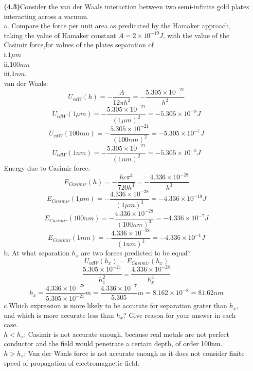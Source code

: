 \documentclass[a4paper,12pt]{report}
\begin{document}
\textbf{(4.3)}Consider the van der Waals interaction between two semi-infinite gold plates interacting across a vacuum.\\
a. Compare the force per unit area as predicated by the Hamaker approach, taking the value of Hamaker constant $A = 2\times 10^{-19} J$, with the value of the Casimir force,for values of the plates separation of\\i.$1 \mu m$\\ii.$100 nm$\\iii.$1 nm$.
\\van der Waals:
\[
U_{vdW}(h) = -\frac{A}{12\pi h^2} = -\frac{5.305\times 10^{-21}}{h^2} 
\]
\[
U_{vdW}(1 \mu m) = -\frac{5.305\times 10^{-21}}{(1 \mu m)^2} =-5.305\times 10^{-9}J
\]
\[
U_{vdW}(100 nm) = -\frac{5.305\times 10^{-21}}{(100 nm)^2} =-5.305\times 10^{-7}J
\]
\[
U_{vdW}(1 nm) = -\frac{5.305\times 10^{-21}}{(1 nm)^2} =-5.305\times 10^{-3}J
\]
Energy due to Casimir force:
\[
E_{Casimir}(h) = -\frac{\hbar c \pi^2}{720 h^3}=-\frac{4.336\times 10^{-28}}{h^3}
\] 
\[
E_{Casimir}(1 \mu m) =-\frac{4.336\times 10^{-28}}{(1 \mu m)^3}= -4.336\times 10^{-10}J
\]
\[
E_{Casimir}(100 nm) =-\frac{4.336\times 10^{-28}}{(100 nm)^3}=-4.336\times 10^{-7}J
\]
\[
E_{Casimir}(1 nm) =-\frac{4.336\times 10^{-28}}{(1 nm)^3}=-4.336\times 10^{-1}J
\]
b. At what separation $h_x$ are two forces predicted to be equal?
\[
U_{vdW}(h_x) = E_{Casimir}(h_x)
\]
\[
\frac{5.305\times 10^{-21}}{h_x^2}=\frac{4.336\times 10^{-28}}{h_x^3}
\]
\[
h_x = \frac{4.336\times 10^{-28}}{5.305\times 10^{-21}}m=\frac{4.336\times 10^{-7}}{5.305}m = 8.162\times 10^{-8}=81.62 nm
\]
c.Which expression is more likely to be accurate for separation grater than $h_x$, and which is more accurate less than $h_x$? Give reason for your answer in each case.\\
$h<h_x$:
Casimir is not accurate enough, because real metals are not perfect conductor and the field would penetrate a certain depth, of order 100nm.\\
$h>h_x$:
Van der Waals force is not accurate enough as it does not consider finite speed of propagation of electromagnetic field.
\end{document}
